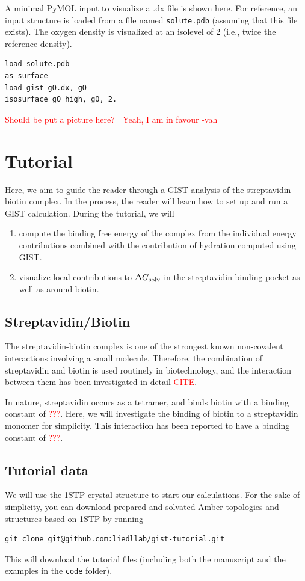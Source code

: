 \documentclass[9pt,tutorial]{livecoms}
\newcommand{\dgsolv}{\Delta G_\textup{solv}}
\newcommand{\software}{\texttt}
\newcommand{\todo}{\textcolor{red}}
\newcommand\inlinecode{\texttt}
\begin{document}
A minimal PyMOL input to visualize a .dx file is shown here.
For reference, an input structure is loaded from a file named \inlinecode{solute.pdb} (assuming that this file exists).
The oxygen density is visualized at an isolevel of 2 (i.e., twice the reference density).

\begin{lstlisting}
load solute.pdb
as surface
load gist-gO.dx, gO
isosurface gO_high, gO, 2.
\end{lstlisting}

\todo{Should be put a picture here? | Yeah, I am in favour -vah}

\section{Tutorial}
Here, we aim to guide the reader through a GIST analysis of the streptavidin-biotin complex.
In the process, the reader will learn how to set up and run a GIST calculation.
During the tutorial, we will
\begin{enumerate}
	\item compute the binding free energy of the complex from the individual energy contributions combined with the contribution of hydration computed using GIST.
	\item visualize local contributions to $\dgsolv$ in the streptavidin binding pocket as well as around biotin.
\end{enumerate}

\subsection{Streptavidin/Biotin}
The streptavidin-biotin complex is one of the strongest known non-covalent interactions involving a small molecule.
Therefore, the combination of streptavidin and biotin is used routinely in biotechnology, and the interaction between them has been investigated in detail \todo{CITE}\cite{}.

In nature, streptavidin occurs as a tetramer, and binds biotin with a binding constant of \todo{???}.
Here, we will investigate the binding of biotin to a streptavidin monomer for simplicity.
This interaction has been reported to have a binding constant of \todo{???}.

\subsection{Tutorial data}
We will use the 1STP crystal structure to start our calculations.
For the sake of simplicity, you can download prepared and solvated Amber topologies and structures based on 1STP by running
\begin{lstlisting}
git clone git@github.com:liedllab/gist-tutorial.git
\end{lstlisting}
This will download the tutorial files (including both the manuscript and the examples in the \software{code} folder).
\end{document}

